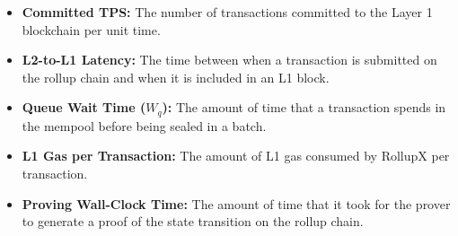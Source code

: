 \begin{itemize}
\item \textbf{Committed TPS:} The number of transactions committed to the Layer 1 blockchain per unit time.
\item \textbf{L2-to-L1 Latency:} The time between when a transaction is submitted on the rollup chain and when it is included in an L1 block.
\item \textbf{Queue Wait Time ($W_q$):} The amount of time that a transaction spends in the mempool before being sealed in a batch.
\item \textbf{L1 Gas per Transaction:} The amount of L1 gas consumed by RollupX per transaction.
\item \textbf{Proving Wall-Clock Time:} The amount of time that it took for the prover to generate a proof of the state transition on the rollup chain.
\end{itemize}
